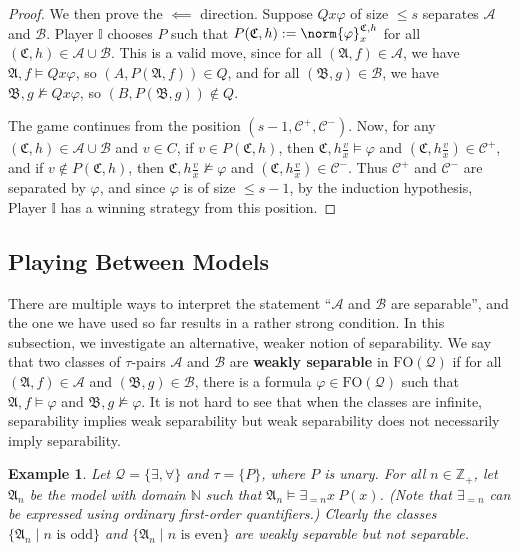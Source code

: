 \documentclass{article}
\newtheorem{example}[theorem]{Example}
\theoremstyle{definition}
\begin{document}
\begin{proof}
    We then prove the $\impliedby$ direction. Suppose $Qx\varphi$ of size $\leq s$ separates $\mathcal{A}$ and $\mathcal{B}$. Player $\mathbb{I}$ chooses $P$ such that $P(\mathfrak{C},h):=\norm{\varphi}^{\mathfrak{C},h}_x$ for all $(\mathfrak{C},h)\in \mathcal{A}\cup\mathcal{B}$. This is a valid move, since for all $(\mathfrak{A},f)\in\mathcal{A}$, we have $\mathfrak{A},f\models Qx\varphi$, so $(A,P(\mathfrak{A},f))\in Q$, and for all $(\mathfrak{B},g)\in\mathcal{B}$, we have $\mathfrak{B},g\not\models Qx\varphi$, so $(B,P(\mathfrak{B},g))\notin Q$.
    
    The game continues from the position $(s-1,\mathcal{C}^+,\mathcal{C}^-)$. Now, for any $(\mathfrak{C},h)\in\mathcal{A}\cup\mathcal{B}$ and $v \in C$, if $v\in P(\mathfrak{C},h)$, then $\mathfrak{C},h\frac{v}{x}\models \varphi$ and $(\mathfrak{C},h\frac{v}{x})\in \mathcal{C}^+$, and if $v\notin P(\mathfrak{C},h)$, then $\mathfrak{C},h\frac{v}{x}\not\models \varphi$ and $(\mathfrak{C},h\frac{v}{x})\in \mathcal{C}^-$. Thus $\mathcal{C}^+$ and $\mathcal{C}^-$ are separated by $\varphi$, and since $\varphi$ is of size $\leq s-1$, by the induction hypothesis, Player $\mathbb{I}$ has a winning strategy from this position.
\end{proof}

\subsection{Playing Between Models}

There are multiple ways to interpret the statement ``$\mathcal{A}$ and $\mathcal{B}$ are separable'', and the one we have used so far results in a rather strong condition. In this subsection, we investigate an alternative, weaker notion of separability. We say that two classes of $\tau$-pairs $\mathcal{A}$ and $\mathcal{B}$ are \textbf{weakly separable} in $\mathrm{FO}(\mathcal{Q})$ if for all $(\mathfrak{A},f)\in \mathcal{A}$ and $(\mathfrak{B},g)\in \mathcal{B}$, there is a formula $\varphi\in\mathrm{FO}(\mathcal{Q})$ such that $\mathfrak{A},f\models \varphi$ and $\mathfrak{B},g\not\models\varphi$. It is not hard to see that when the classes are infinite, separability implies weak separability but weak separability does not necessarily imply separability. 
\begin{example}
    Let $\mathcal{Q}=\{\exists,\forall\}$ and $\tau=\{P\}$, where $P$ is unary. For all $n\in \mathbb{Z}_+$, let $\mathfrak{A}_n$ be the model with domain $\mathbb{N}$ such that $\mathfrak{A}_n\models \exists_{=n}x\ P(x)$. (Note that $\exists_{=n}$ can be expressed using ordinary first-order quantifiers.) Clearly the classes $\{\mathfrak{A}_n\mid n\text{ is odd}\}$ and $\{\mathfrak{A}_n\mid n\text{ is even}\}$ are weakly separable but not separable.
\end{example}
\end{document}

